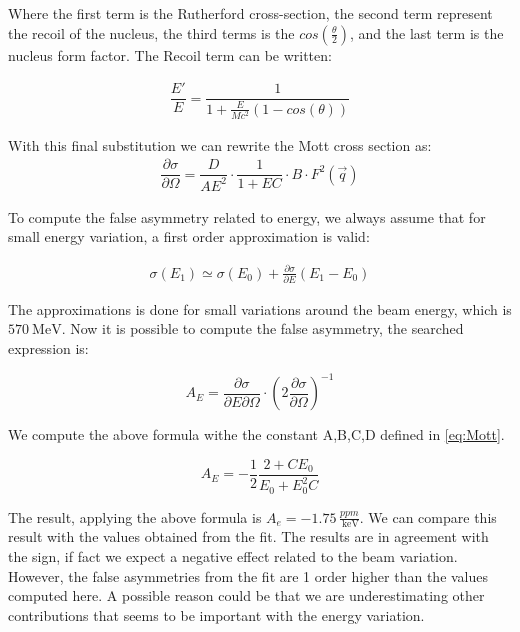 Where the first term is the Rutherford cross-section, the second term represent the recoil of the nucleus, the third terms is the $cos(\frac{\theta}{2})$, and the last term is the nucleus form factor. The Recoil term can be written:

\begin{align*}
\dfrac{E'}{E} = \dfrac{1}{1 + \frac{E}{Mc^{2}} (1 - cos(\theta))}
\end{align*}

With this final substitution we can rewrite the Mott cross section as:
\begin{align*}
\dfrac{\partial \sigma}{\partial \Omega} = \dfrac{D}{AE^{2}} \cdot \dfrac{1}{1 + EC} \cdot B \cdot F^{2}(\vec{q})
\end{align*}
 
To compute the false asymmetry related to energy, we always assume that for small energy variation, a first order approximation is valid:

\begin{align*}
\sigma (E_{1}) \simeq \sigma(E_{0}) + \frac{\partial \sigma}{\partial E} (E_{1} - E_{0})
\end{align*}

The approximations is done for small variations around the beam energy, which is $\SI{570}{\mega \electronvolt}$.
Now it is possible to compute the false asymmetry, the searched expression is:

\begin{equation}
A_{E} = \dfrac{\partial \sigma}{\partial E \partial \Omega} \cdot  (2 \dfrac{\partial \sigma}{\partial \Omega})^{-1}
\end{equation}

We compute the above formula withe the constant A,B,C,D defined in \ref{eq:Mott}.

\begin{equation}
A_{E} = - \frac{1}{2} \dfrac{2 + CE_{0}}{E_{0} + E_{0}^{2}C} 
\end{equation}

The result, applying the above formula is $A_{e} = -1.75 \, \frac{ppm}{\SI{}{\kilo \electronvolt}}$. We can compare this result with the values obtained from the fit. The results are in agreement with the sign, if fact we expect a negative effect related to the beam variation. However, the false asymmetries from the fit are 1 order higher than the values computed here. A possible reason could be that we are underestimating other contributions that seems to be important with the energy variation.

